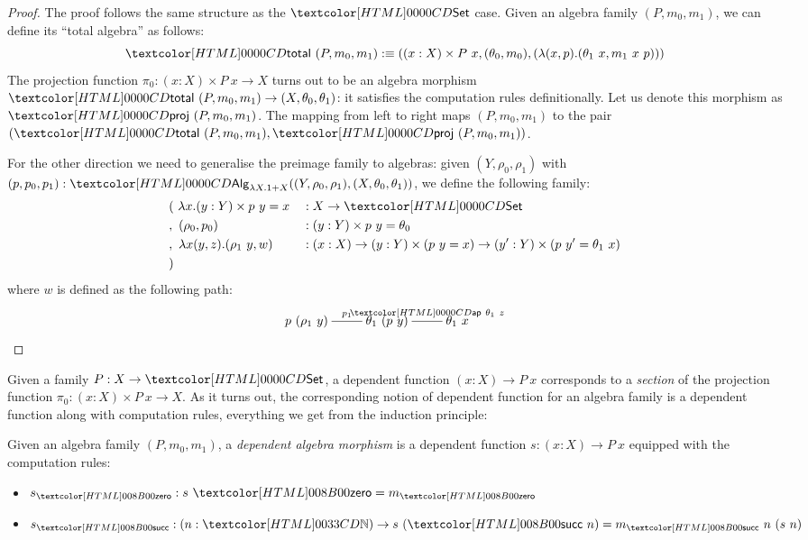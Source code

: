 \begin{proof}
  The proof follows the same structure as the $\Set$ case. Given an
  algebra family $(P,m_0,m_1)$, we can define its ``total algebra'' as
  follows:
  $$
  \total\ (P,m_0,m_1) \ddefeq ((x : X) \times P\ x , (\theta_0, m_0), (\lambda (x,p) . (\theta_1\ x, m_1\ x\ p)))
  $$
  The projection function $\pi_0 : (x : X) \times P\ x \to X$ turns
  out to be an algebra morphism
  $\total\ (P,m_0,m_1) \to (X,\theta_0,\theta_1)$: it satisfies the
  computation rules definitionally. Let us denote this morphism as
  $\proj\ (P,m_0,m_1)$. The mapping from left to right maps
  $(P,m_0,m_1)$ to the pair
  $(\total\ (P,m_0,m_1), \proj\ (P,m_0,m_1))$.

  For the other direction we need to generalise the preimage family to
  algebras: given $(Y,\rho_0,\rho_1)$ with
  $(p,p_0,p_1) : \Alg_{\lambda X . 1 +
    X}((Y,\rho_0,\rho_1),(X,\theta_0,\theta_1))$,
  we define the following family:
  \begin{align*}
  &(\ \lambda x . (y : Y) \times p\ y = x &&: X \to \Set \\
  &,\ (\rho_0 , p_0) &&: (y : Y) \times p\ y = \theta_0 \\
  &,\ \lambda x (y,z) . (\rho_1\ y , w) &&: (x : X) \to (y : Y) \times (p\ y = x) \to (y' : Y) \times (p\ y' = \theta_1\ x)\\
  &)
  \end{align*}
  where $w$ is defined as the following path:
  $$
  \xymatrix{
    p\ (\rho_1\ y) \ar@{-}[r]^-{p_1} &\theta_1\ (p\ y) \ar@{-}^-{\ap\ \theta_1\ z}[r] &\theta_1\ x
  }
  $$
\end{proof}

Given a family $P : X \to \Set$, a dependent function
$(x : X) \to P\ x$ corresponds to a \emph{section} of the projection
function $\pi_0 : (x : X) \times P\ x \to X$. As it turns out, the
corresponding notion of dependent function for an algebra family is a
dependent function along with computation rules, \ie everything we get
from the induction principle:

\begin{definition}
  Given an algebra family $(P,m_0,m_1)$, a \emph{dependent algebra
    morphism} is a dependent function $s : (x : X) \to P\ x$ equipped
  with the computation rules:
  \begin{itemize}
  \item $s_{\natzero} : s\ \natzero = m_{\natzero}$
  \item $s_{\natsucc} : (n : \natty) \to s\ (\natsucc\ n) = m_{\natsucc}\ n\ (s\ n)$
  \end{itemize}
\end{definition}

